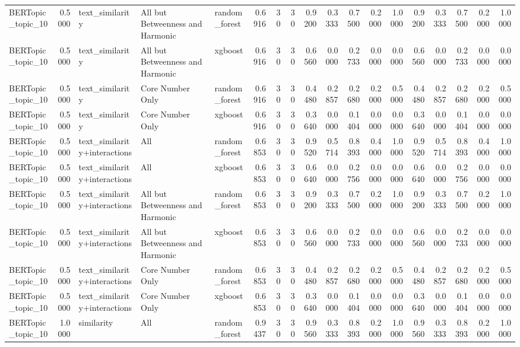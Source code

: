 \begin{tabular}{lrlllrrrrrrrrrrrrr}
BERTopic_topic_10 & 0.5000 & text_similarity & All but Betweenness and Harmonic & random_forest & 0.6916 & 30 & 30 & 0.9200 & 0.3333 & 0.7500 & 0.2000 & 1.0000 & 0.9200 & 0.3333 & 0.7500 & 0.2000 & 1.0000 \\
BERTopic_topic_10 & 0.5000 & text_similarity & All but Betweenness and Harmonic & xgboost & 0.6916 & 30 & 30 & 0.6560 & 0.0000 & 0.2733 & 0.0000 & 0.0000 & 0.6560 & 0.0000 & 0.2733 & 0.0000 & 0.0000 \\
BERTopic_topic_10 & 0.5000 & text_similarity & Core Number Only & random_forest & 0.6916 & 30 & 30 & 0.4480 & 0.2857 & 0.2680 & 0.2000 & 0.5000 & 0.4480 & 0.2857 & 0.2680 & 0.2000 & 0.5000 \\
BERTopic_topic_10 & 0.5000 & text_similarity & Core Number Only & xgboost & 0.6916 & 30 & 30 & 0.3640 & 0.0000 & 0.1404 & 0.0000 & 0.0000 & 0.3640 & 0.0000 & 0.1404 & 0.0000 & 0.0000 \\
BERTopic_topic_10 & 0.5000 & text_similarity+interactions & All & random_forest & 0.6853 & 30 & 30 & 0.9520 & 0.5714 & 0.8393 & 0.4000 & 1.0000 & 0.9520 & 0.5714 & 0.8393 & 0.4000 & 1.0000 \\
BERTopic_topic_10 & 0.5000 & text_similarity+interactions & All & xgboost & 0.6853 & 30 & 30 & 0.6640 & 0.0000 & 0.2756 & 0.0000 & 0.0000 & 0.6640 & 0.0000 & 0.2756 & 0.0000 & 0.0000 \\
BERTopic_topic_10 & 0.5000 & text_similarity+interactions & All but Betweenness and Harmonic & random_forest & 0.6853 & 30 & 30 & 0.9200 & 0.3333 & 0.7500 & 0.2000 & 1.0000 & 0.9200 & 0.3333 & 0.7500 & 0.2000 & 1.0000 \\
BERTopic_topic_10 & 0.5000 & text_similarity+interactions & All but Betweenness and Harmonic & xgboost & 0.6853 & 30 & 30 & 0.6560 & 0.0000 & 0.2733 & 0.0000 & 0.0000 & 0.6560 & 0.0000 & 0.2733 & 0.0000 & 0.0000 \\
BERTopic_topic_10 & 0.5000 & text_similarity+interactions & Core Number Only & random_forest & 0.6853 & 30 & 30 & 0.4480 & 0.2857 & 0.2680 & 0.2000 & 0.5000 & 0.4480 & 0.2857 & 0.2680 & 0.2000 & 0.5000 \\
BERTopic_topic_10 & 0.5000 & text_similarity+interactions & Core Number Only & xgboost & 0.6853 & 30 & 30 & 0.3640 & 0.0000 & 0.1404 & 0.0000 & 0.0000 & 0.3640 & 0.0000 & 0.1404 & 0.0000 & 0.0000 \\
BERTopic_topic_10 & 1.0000 & similarity & All & random_forest & 0.9437 & 30 & 30 & 0.9560 & 0.3333 & 0.8393 & 0.2000 & 1.0000 & 0.9560 & 0.3333 & 0.8393 & 0.2000 & 1.0000 \\

\end{tabular}
